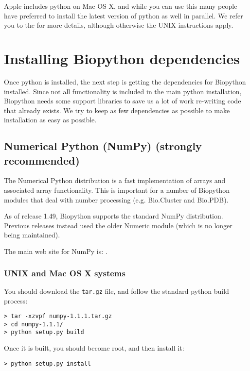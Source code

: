 \documentclass{article}
\begin{document}
Apple includes python on Mac OS X, and while you can use this many people have
preferred to install the latest version of python as well in parallel.  We refer
you to the  for more details, although
otherwise the UNIX instructions apply.

\section{Installing Biopython dependencies}

Once python is installed, the next step is getting the dependencies
for Biopython installed. Since not all functionality is included in the
main python installation, Biopython needs some support libraries to save
us a lot of work re-writing code that already exists. We try to keep
as few dependencies as possible to make installation as easy as
possible.

\subsection{Numerical Python (NumPy) (strongly recommended)}

The Numerical Python distribution is a fast implementation of arrays and
associated array functionality. This is important for a number of Biopython
modules that deal with number processing (e.g. Bio.Cluster and Bio.PDB).

As of release 1.49, Biopython supports the standard NumPy distribution.
Previous releases instead used the older Numeric module (which is no
longer being maintained).

The main web site for NumPy is:
.

\subsubsection{UNIX and Mac OS X systems}

You should download the \verb|tar.gz| file, and follow the standard python
build process:

\begin{verbatim}
> tar -xzvpf numpy-1.1.1.tar.gz
> cd numpy-1.1.1/
> python setup.py build
\end{verbatim}

Once it is built, you should become root, and then install it:

\begin{verbatim}
> python setup.py install
\end{verbatim}
\end{document}
